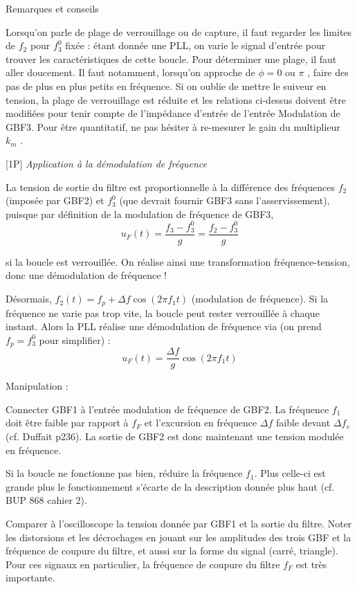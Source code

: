 \documentclass{article}%
\begin{document}
Remarques et conseils

    Lorsqu'on parle de plage de verrouillage ou de capture, il faut regarder les limites de $f_2$ pour  $f_3^0$ fixée : étant donnée une PLL, on varie le signal d'entrée pour trouver les caractéristiques de cette boucle.
    Pour déterminer une plage, il faut aller doucement. Il faut notamment, lorsqu'on approche de $\phi = 0$ ou $\pi$ , faire des pas de plus en plus petits en fréquence.
    Si on oublie de mettre le suiveur en tension, la plage de verrouillage est réduite et les relations ci-dessus doivent être modifiées pour tenir compte de l'impédance d'entrée de l'entrée Modulation de GBF3.
    Pour être quantitatif, ne pas hésiter à re-mesurer le gain du multiplieur $k_m$ .

    [1P] \textit{Application à la démodulation de fréquence}

La tension de sortie du filtre est proportionnelle à la différence des fréquences $f_2$ (imposée par GBF2) et $f_{3}^0$ (que devrait fournir GBF3 sans l'asservissement), puisque par définition de la modulation de fréquence de GBF3,
\[ u_F(t) = \frac{f_3 - f_3^0}{g} = \frac{f_2 - f_3^0}{g}\]

si la boucle est verrouillée. On réalise ainsi une transformation fréquence-tension, donc une démodulation de fréquence !

Désormais, $f_2(t) = f_p + \Delta f \cos(2 \pi f_1 t)$ (modulation de fréquence). Si la fréquence ne varie pas trop vite, la boucle peut rester verrouillée à chaque instant. Alors la PLL réalise une démodulation de fréquence via (on prend $f_p = f_3^0$ pour simplifier) :
\[ u_F(t) =\frac{\Delta f}{g} \cos(2 \pi f_1 t)\]

Manipulation :

    Connecter GBF1 à l'entrée modulation de fréquence de GBF2. La fréquence $f_1$ doit être faible par rapport à $f_F$ et l'excursion en fréquence $\Delta f$ faible devant $\Delta f_v$ (cf. Duffait p236). La sortie de GBF2 est donc maintenant une tension modulée en fréquence.

Si la boucle ne fonctionne pas bien, réduire la fréquence $f_1$. Plus celle-ci est grande plus le fonctionnement s'écarte de la description donnée plus haut (cf. BUP 868 cahier 2).

    Comparer à l'oscilloscope la tension donnée par GBF1 et la sortie du filtre. Noter les distorsions et les décrochages en jouant sur les amplitudes des trois GBF et la fréquence de coupure du filtre, et aussi sur la forme du signal (carré, triangle). Pour ces signaux en particulier, la fréquence de coupure du filtre $f_F$ est très importante.
\end{document}
